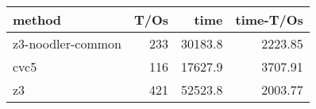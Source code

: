 \begin{tabular}{lrrr}
\hline
 method            &   T/Os &    time &   time-T/Os \\
\hline
 z3-noodler-common &    233 & 30183.8 &     2223.85 \\
 cvc5              &    116 & 17627.9 &     3707.91 \\
 z3                &    421 & 52523.8 &     2003.77 \\
\hline
\end{tabular}
